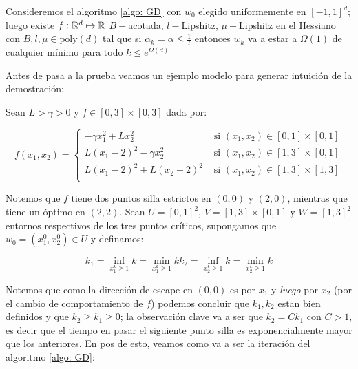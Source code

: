 \begin{theorem}
	Consideremos el algoritmo \ref{algo: GD} con $w_0$ elegido uniformemente en $[-1,1]^d$; luego existe $f : {\mathbb{R}}^d \mapsto {\mathbb{R}}$ $B-$acotada, $l-$Lipshitz, $\mu-$Lipshitz en el Hessiano con $B,l,\mu \in \text{poly}(d)$ tal que si $\alpha_k = \alpha \leq \frac{1}{l}$ entonces $w_k$ va a estar a $\Omega(1)$ de cualquier m\'inimo para todo $k \leq e^{\Omega(d)}$
\end{theorem}

Antes de pasa a la prueba veamos un ejemplo modelo para generar intuici\'on de la demostraci\'on:

\begin{remark}
	Sean $L > \gamma > 0$ y $f \in [0,3] \times [0,3]$ dada por:
	
	\begin{equation}
		f(x_1, x_2) = \left\lbrace \begin{array}{cc}
		- \gamma x_1^2 + Lx_2^2 & \text{ si } (x_1,x_2) \in [0,1] \times [0,1] \\
		L \left(x_1 - 2\right)^2 - \gamma x_2^2 & \text{ si } (x_1,x_2) \in [1,3] \times [0,1] \\
		L \left(x_1 - 2\right)^2 + L \left(x_2 - 2\right)^2 & \text{ si } (x_1,x_2) \in [1,3] \times [1,3] \\
		\end{array} \right.
	\end{equation}
	
	Notemos que $f$ tiene dos puntos silla estrictos en $(0,0)$ y $(2,0)$, mientras que tiene un \'optimo en $(2,2)$. Sean $U = [0,1]^2$, $V= [1,3] \times [0,1]$ y $W = [1,3]^2$ entornos respectivos de los tres puntos cr\'iticos, supongamos que $w_0 = \left(x^0_1, x^0_2\right) \in U$ y definamos:
	
	\begin{subequations}
		\begin{equation*}
			k_1 = \inf\limits_{x^k_1 \geq 1}{k} = \min\limits_{x^k_1 \geq 1}{k}
		\end{equation*}
		\begin{equation*}
		k_2 = \inf\limits_{x^k_2 \geq 1}{k} = \min\limits_{x^k_2 \geq 1}{k}
		\end{equation*}
	\end{subequations}
	
	Notemos que como la direcci\'on de escape en $(0,0)$ es por $x_1$ y \textit{luego} por $x_2$ (por el cambio de comportamiento de $f$) podemos concluir que $k_1,k_2$ estan bien definidos y que $k_2 \geq k_1 \geq 0$; la observaci\'on clave va a ser que $k_2 = Ck_1$ con $C>1$, es decir que el tiempo en pasar el siguiente punto silla es exponencialmente mayor que los anteriores. En pos de esto, veamos como va a ser la iteraci\'on del algoritmo \ref{algo: GD}:
	

\end{remark}
